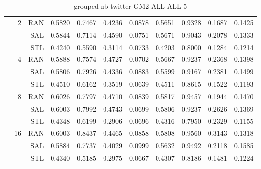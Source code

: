 \begin{center}
\begin{table}[htbp]
\begin{center}
\begin{tabular}{ | r | r | r | r | r | r | r | r | r | r | r |}
 & \multirow{3}{*}{2} & RAN & 0.5820 & 0.7467 & 0.4236 & 0.0878 & 0.5651 & 0.9328 & 0.1687 & 0.1425\\ \cline{3-11}
 &   & SAL & 0.5844 & 0.7114 & 0.4590 & 0.0751 & 0.5671 & 0.9043 & 0.2078 & 0.1333\\ \cline{3-11}
 &   & STL & 0.4240 & 0.5590 & 0.3114 & 0.0733 & 0.4203 & 0.8000 & 0.1284 & 0.1214\\ \cline{2-11}
 & \multirow{3}{*}{4} & RAN & 0.5888 & 0.7574 & 0.4727 & 0.0702 & 0.5667 & 0.9237 & 0.2368 & 0.1398\\ \cline{3-11}
 &   & SAL & 0.5806 & 0.7926 & 0.4336 & 0.0883 & 0.5599 & 0.9167 & 0.2381 & 0.1499\\ \cline{3-11}
 &   & STL & 0.4510 & 0.6162 & 0.3519 & 0.0639 & 0.4511 & 0.8615 & 0.1522 & 0.1193\\ \cline{2-11}
 & \multirow{3}{*}{8} & RAN & 0.6026 & 0.7797 & 0.4710 & 0.0839 & 0.5817 & 0.9457 & 0.1944 & 0.1470\\ \cline{3-11}
 &   & SAL & 0.6003 & 0.7992 & 0.4743 & 0.0699 & 0.5806 & 0.9237 & 0.2626 & 0.1369\\ \cline{3-11}
 &   & STL & 0.4348 & 0.6199 & 0.2906 & 0.0696 & 0.4316 & 0.7950 & 0.2329 & 0.1155\\ \cline{2-11}
 & \multirow{3}{*}{16} & RAN & 0.6003 & 0.8437 & 0.4465 & 0.0858 & 0.5808 & 0.9560 & 0.3143 & 0.1318\\ \cline{3-11}
 &   & SAL & 0.5884 & 0.7737 & 0.4029 & 0.0999 & 0.5632 & 0.9492 & 0.2118 & 0.1585\\ \cline{3-11}
 &   & STL & 0.4340 & 0.5185 & 0.2975 & 0.0667 & 0.4307 & 0.8186 & 0.1481 & 0.1224\\ \cline{2-11}
\hline
\end{tabular}
\caption{grouped-nb-twitter-GM2-ALL-ALL-5}
\end{center}
 \end{table}
\end{center}

